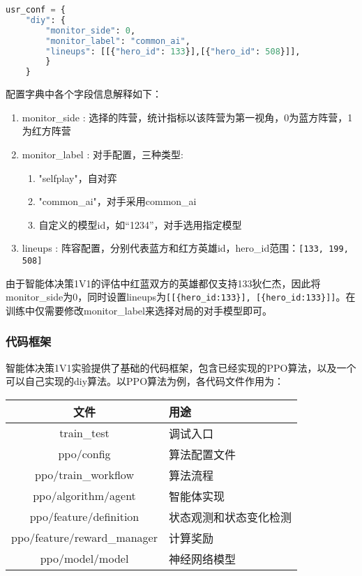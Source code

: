{
\linespread{1.25} \selectfont
\begin{lstlisting}[language=Python]
usr_conf = {
    "diy": {
        "monitor_side": 0,
        "monitor_label": "common_ai",
        "lineups": [[{"hero_id": 133}],[{"hero_id": 508}]],
        }
    }
\end{lstlisting}
}

配置字典中各个字段信息解释如下：

\begin{enumerate}
    \item monitor\_side : 选择的阵营，统计指标以该阵营为第一视角，0为蓝方阵营，1为红方阵营
    \item  monitor\_label : 对手配置，三种类型:
          \begin{enumerate}
              \item "selfplay"，自对弈
              \item "common\_ai"，对手采用common\_ai
              \item 自定义的模型id，如“1234”，对手选用指定模型
          \end{enumerate}
    \item lineups : 阵容配置，分别代表蓝方和红方英雄id，hero\_id范围：\verb|[133, 199, 508]|
\end{enumerate}

由于智能体决策1V1的评估中红蓝双方的英雄都仅支持133狄仁杰，因此将monitor\_side为0，同时设置lineups为\verb|[[{hero_id:133}], [{hero_id:133}]]|。在训练中仅需要修改monitor\_label来选择对局的对手模型即可。

\subsubsection{代码框架}

智能体决策1V1实验提供了基础的代码框架，包含已经实现的PPO算法，以及一个可以自己实现的diy算法。以PPO算法为例，各代码文件作用为：
\begin{center}
    \begin{tabular}{|c|l|} \hline
        \bfseries 文件              & \bfseries 用途         \\ \hline
        train\_test                 & 调试入口               \\ \hline
        ppo/config                  & 算法配置文件           \\ \hline
        ppo/train\_workflow         & 算法流程               \\ \hline
        ppo/algorithm/agent         & 智能体实现             \\ \hline
        ppo/feature/definition      & 状态观测和状态变化检测 \\ \hline
        ppo/feature/reward\_manager & 计算奖励               \\ \hline
        ppo/model/model             & 神经网络模型           \\ \hline
    \end{tabular}
\end{center}

